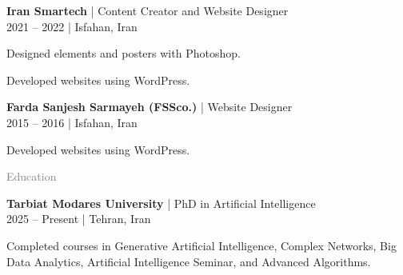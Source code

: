 \documentclass[a4paper]{deedy-resume}
\begin{document}
\begin{minipage}[t]{0.62\textwidth}
\small

\textbf{Iran Smartech} | Content Creator and Website Designer \\
\vspace{\itemsep}
2021 – 2022 | Isfahan, Iran
\vspace{\itemsep}
\begin{tightitemize}
\item Designed elements and posters with Photoshop.
\item Developed websites using WordPress.
\end{tightitemize}
\vspace{\topsep}

\textbf{Farda Sanjesh Sarmayeh (FSSco.)} | Website Designer \\
\vspace{\itemsep}
2015 – 2016 | Isfahan, Iran
\vspace{\itemsep}
\begin{tightitemize}
\item Developed websites using WordPress.
\end{tightitemize}
\vspace{\topsep}

\textcolor{gray}{\huge{Education}}
\vspace{\topsep}

\textbf{Tarbiat Modares University} | PhD in Artificial Intelligence \\
\vspace{\itemsep}
2025 – Present | Tehran, Iran
\vspace{\itemsep}
\begin{tightitemize}
\item Completed courses in Generative Artificial Intelligence, Complex Networks, Big Data Analytics, Artificial Intelligence Seminar, and Advanced Algorithms.
\end{tightitemize}
\sectionspace


\end{minipage}
\end{document}
